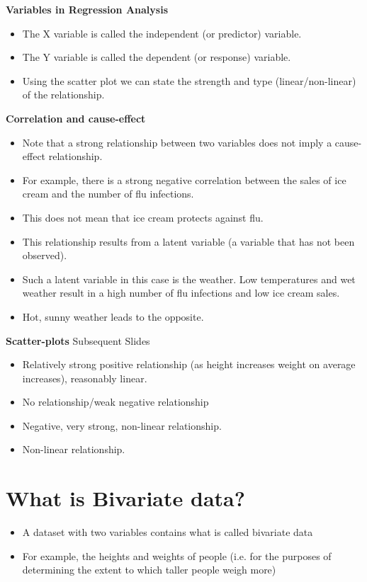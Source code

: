 
\noindent \textbf{Variables in Regression Analysis }
\begin{itemize}
	\item The X variable is called the independent (or predictor) variable.
	\item The Y variable is called the dependent (or response) variable.
	\item Using the scatter plot we can state the strength and type
	(linear/non-linear) of the relationship.
\end{itemize}
\noindent \textbf{Correlation and cause-effect}
\begin{itemize}
	\item Note that a strong relationship between two variables does not
	imply a cause-effect relationship.
	\item For example, there is a strong negative correlation between the
	sales of ice cream and the number of flu infections.
	\item This does not mean that ice cream protects against flu.
	\item This relationship results from a latent variable (a variable that has
	not been observed).
	\item Such a latent variable in this case is the weather. Low
	temperatures and wet weather result in a high number of flu
	infections and low ice cream sales. \item Hot, sunny weather leads to the
	opposite.
\end{itemize}

\noindent \textbf{Scatter-plots}
Subsequent Slides
\begin{itemize}
	\item Relatively strong positive relationship (as height increases
	weight on average increases), reasonably linear.
	\item No relationship/weak negative relationship
	\item Negative, very strong, non-linear relationship.
	\item Non-linear relationship.
\end{itemize}
\section{What is Bivariate data?}


\begin{itemize}
	
	
	\item A dataset with two variables contains what is called bivariate data 
	\item For example, the heights and weights of people (i.e. for the purposes of determining the extent to which taller people weigh more)
	
\end{itemize}




